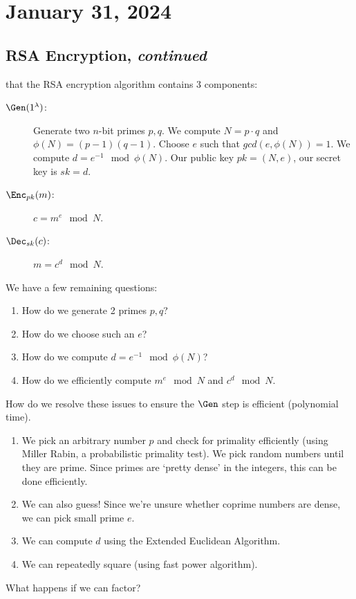\section{January 31, 2024}
\label{20240131}
\subsection{RSA Encryption, \emph{continued}}
\recall that the RSA encryption algorithm contains 3 components:
\begin{description}
    \item[$\Gen(1^\lambda)$:] Generate two $n$-bit primes $p, q$. We compute $N = p\cdot q$ and $\phi(N) = (p-1)(q-1)$. Choose $e$ such that $gcd(e, \phi(N)) = 1$. We compute $d = e^{-1}\mod{\phi(N)}$. Our public key $pk = (N, e)$, our secret key is $sk = d$.
    \item[$\Enc_{pk}(m)$:] $c = m^e\mod{N}$.
    \item[$\Dec_{sk}(c)$:] $m = c^d\mod{N}$.
\end{description}
We have a few remaining questions:
\begin{enumerate}
    \item How do we generate 2 primes $p, q$?
    \item How do we choose such an $e$?
    \item How do we compute $d = e^{-1}\mod{\phi(N)}$?
    \item How do we efficiently compute $m^e\mod{N}$ and $c^d\mod N$.
\end{enumerate}
How do we resolve these issues to ensure the $\Gen$ step is efficient (polynomial time).
\begin{enumerate}
    \item We pick an arbitrary number $p$ and check for primality efficiently (using Miller Rabin, a probabilistic primality test). We pick random numbers until they are prime. Since primes are `pretty dense' in the integers, this can be done efficiently.
    \item We can also guess! Since we're unsure whether coprime numbers are dense, we can pick small prime $e$.
    \item We can compute $d$ using the Extended Euclidean Algorithm.
    \item We can repeatedly square (using fast power algorithm).
\end{enumerate}

\begin{ques*}
    What happens if we can factor?
\end{ques*}
    
